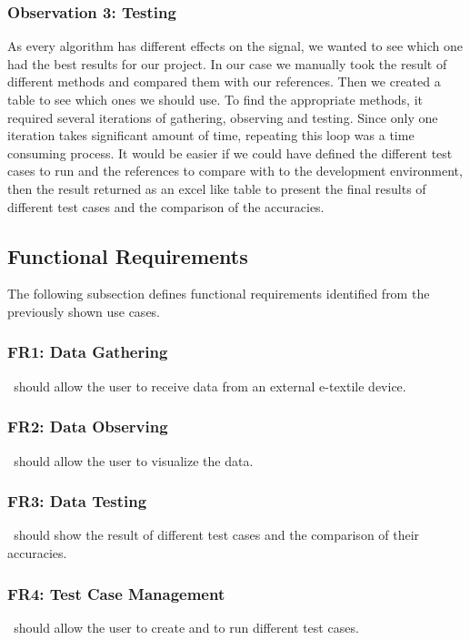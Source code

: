 \subsubsection{Observation 3: Testing}


As every algorithm has different effects on the signal, we wanted to see which one had the best results for our project. In our case we manually took the result of different methods and compared them with our references. Then we created a table to see which ones we should use. To find the appropriate methods, it required several iterations of gathering, observing and testing. Since only one iteration takes significant amount of time, repeating this loop was a time consuming process. It would be easier if we could have defined the different test cases to run and the references to compare with to the development environment, then the result returned as an excel like table to present the final results of different test cases and the comparison of the accuracies.

\subsection{Functional Requirements}
The following subsection defines functional requirements identified from the previously shown use cases.

\subsubsection{FR1: Data Gathering}
\textit\ should allow the user to receive data from an external e-textile device.

\subsubsection{FR2: Data Observing}
\textit\ should allow the user to visualize the data.

\subsubsection{FR3: Data Testing}
\textit\ should show the result of different test cases and the comparison of their accuracies. 

\subsubsection{FR4: Test Case Management}
\textit\ should allow the user to create and to run different test cases.

